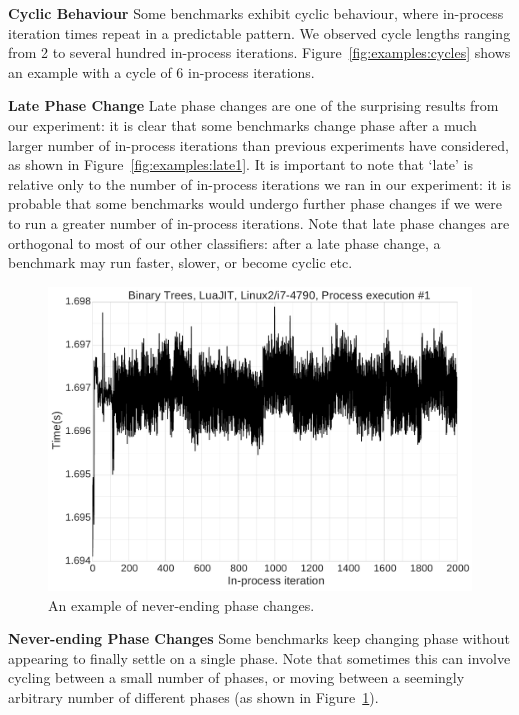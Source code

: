 \documentclass[preprint,numbers,10pt]{sigplanconf}
\begin{document}
\textbf{Cyclic Behaviour} \label{sub:cyclic}
Some benchmarks exhibit cyclic behaviour, where in-process iteration times
repeat in a predictable pattern. We observed cycle lengths ranging from
2 to several hundred in-process iterations. Figure~\ref{fig:examples:cycles} shows
an example with a cycle of 6 in-process iterations.


\textbf{Late Phase Change} \label{sub:phase}
Late phase changes are one of the surprising results from our experiment: it is
clear that some benchmarks change phase after a much larger number of in-process iterations
than previous experiments have considered, as shown in Figure~\ref{fig:examples:late1}.
It is important to note that `late' is relative only to the number of in-process
iterations we ran in our experiment: it is probable that some benchmarks would
undergo further phase changes if we were to run a greater number of in-process
iterations. Note that late phase changes are orthogonal to most of our other
classifiers: after a late phase change, a benchmark may run faster, slower, or
become cyclic etc.


\begin{figure}[t]
\includegraphics[width=.475\textwidth]{examples/many_phases}
\caption{An example of never-ending phase changes.}
\label{fig:examples:neverending}
\end{figure}

\textbf{Never-ending Phase Changes} \label{sub:long}
Some benchmarks keep changing phase without appearing to finally settle on a
single phase. Note that sometimes this can involve cycling between a small
number of phases, or moving between a seemingly arbitrary number of different
phases (as shown in Figure~\ref{fig:examples:neverending}).
\end{document}
